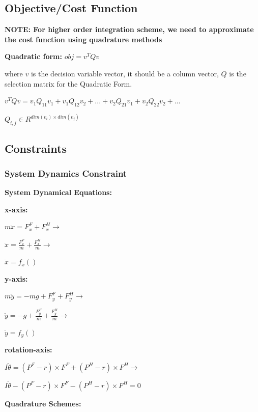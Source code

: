 \documentclass[a4paper,10pt]{article}
\begin{document}
\subsection{Objective/Cost Function}

\textbf{NOTE: For higher order integration scheme, we need to approximate the cost function using quadrature methods}

\textbf{Quadratic form:} $obj = v^TQv$

where $v$ is the decision variable vector, it should be a column vector, $Q$ is the selection matrix for the Quadratic Form.

\vspace{2mm}
$v^TQv = v_1Q_{11}v_1 + v_1Q_{12}v_2 + ... + v_2Q_{21}v_1 + v_2Q_{22}v_2 + ...$

$Q_{i,j} \in R^{dim(v_i) \times dim(v_j)}$ %

\subsection{Constraints}

\subsubsection{System Dynamics Constraint}

\textbf{System Dynamical Equations:}

\textbf{x-axis:}

$m\ddot{x} = F^F_x + F^H_x \rightarrow$

$\ddot{x} = \frac{F^F_x}{m} + \frac{F^H_x}{m} \rightarrow$

$\ddot{x} = f_x()$

\vspace{2mm}

\textbf{y-axis:}

$m\ddot{y} = -mg + F^F_y + F^H_y \rightarrow$

$\ddot{y} = -g + \frac{F^F_y}{m} + \frac{F^H_y}{m} \rightarrow$

$\ddot{y} = f_y()$
\vspace{2mm}

\textbf{rotation-axis:}

$I\ddot{\theta} = (P^F-r) \times F^F + (P^H -r) \times F^H \rightarrow$

$I\ddot{\theta} - (P^F-r) \times F^F - (P^H -r) \times F^H = 0$

\vspace{10mm}

\textbf{Quadrature Schemes:}
\end{document}
